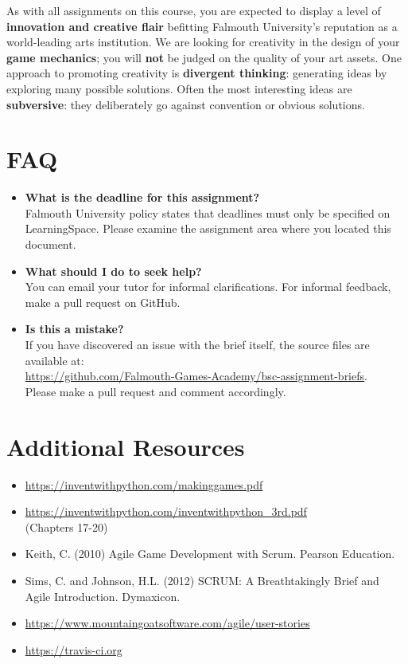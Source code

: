 \documentclass{../fal_assignment}
\begin{document}
As with all assignments on this course, you are expected to display a level of
\textbf{innovation and creative flair} befitting Falmouth University's reputation as a world-leading
arts institution.
We are looking for creativity in the design of your \textbf{game mechanics};
you will \textbf{not} be judged on the quality of your art assets.
One approach to promoting creativity is
\textbf{divergent thinking}: generating ideas by exploring many possible solutions.
Often the most interesting ideas are \textbf{subversive}: they deliberately go against
convention or obvious solutions.

\section*{FAQ}

\begin{itemize}
	\item 	\textbf{What is the deadline for this assignment?} \\ 
    		Falmouth University policy states that deadlines must only be specified on LearningSpace. Please examine the assignment area where you located this document.
    		
	\item 	\textbf{What should I do to seek help?} \\ 
    		You can email your tutor for informal clarifications. For informal feedback, make a pull request on GitHub. 
    		
    	\item 	\textbf{Is this a mistake?} \\ 	
    		If you have discovered an issue with the brief itself, the source files are available at: \\
    		\url{https://github.com/Falmouth-Games-Academy/bsc-assignment-briefs}.\\
    		 Please make a pull request and comment accordingly.
\end{itemize}

\section*{Additional Resources}

\begin{itemize}
    \item \url{https://inventwithpython.com/makinggames.pdf}
    \item \url{https://inventwithpython.com/inventwithpython_3rd.pdf} \\ (Chapters 17-20)
    \item Keith, C. (2010) Agile Game Development with Scrum. Pearson Education.
    \item Sims, C. and Johnson, H.L. (2012) SCRUM: A Breathtakingly Brief and Agile Introduction. Dymaxicon.
    \item \url{https://www.mountaingoatsoftware.com/agile/user-stories}
    \item \url{https://travis-ci.org}
\end{itemize}
\end{document}
